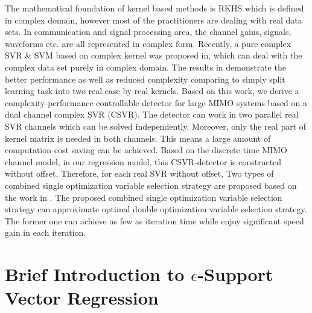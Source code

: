 \documentclass[12pt, draftclsnofoot, onecolumn]{IEEEtran}
\begin{document}
\begin{spacing}{2}
The mathematical foundation of kernel based methods is RKHS which is defined in complex domain, however most of the practitioners are dealing with real data sets. In communication and signal processing area, the channel gains, signals, waveforms etc. are all represented in complex form. Recently, a pure complex SVR \& SVM based on complex kernel was proposed in\cite{bouboulis2013complex}, which can deal with the complex data set purely in complex domain. The results in\cite{bouboulis2013complex} demonstrate the better performance as well as reduced complexity comparing to simply split learning task into two real case by real kernels.  
Based on this work, we derive a complexity-performance controllable detector for large MIMO systems based on a dual channel complex SVR (CSVR). The detector can work in two parallel real SVR channels which can be solved independently. Moreover, only the real part of kernel matrix is needed in both channels. This means a large amount of computation cost saving can be achieved.
Based on the discrete time MIMO channel model, in our regression model, this CSVR-detector
is constructed without offset, Therefore, for each real SVR without offset, 
Two types of combined single optimization variable selection strategy are proposed based on the work in \cite{steinwart2011training}. The proposed combined single optimization variable selection strategy can approximate optimal double optimization variable selection strategy. The former one can achieve as few as iteration time while enjoy significant speed gain in each iteration.
  



\section{Brief Introduction to $\epsilon$-Support Vector Regression}\label{Introduce epsilon SVR}

\end{spacing}
\end{document}
